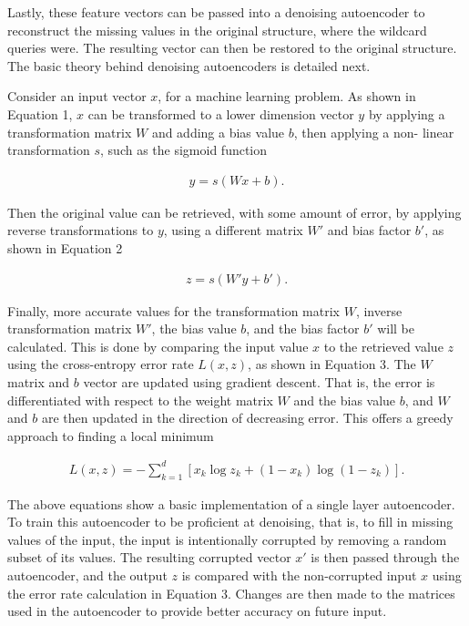 \documentclass{sig-alternate}
\begin{document}
Lastly, these feature vectors can be passed into a denoising autoencoder to reconstruct the missing values
in the original structure, where the wildcard queries were. The resulting vector can then be restored
to the original structure. The basic theory behind denoising autoencoders is detailed next.

Consider an input vector $x$, for a machine learning problem.
As shown in Equation 1, $x$ can be transformed to a lower dimension
vector $y$ by applying a transformation matrix $W$ and adding a bias value $b$, then applying a non-
linear transformation $s$, such as the sigmoid function

\begin{gather}
y = s(Wx + b).
\end{gather}

Then the original value can be retrieved, with some amount of error, by applying reverse transformations to $y$,
using a different matrix $W'$ and bias factor $b'$, as shown in Equation 2

\begin{gather}
z = s(W' y  + b').
\end{gather}

Finally, more accurate values for the transformation matrix $W$, inverse transformation matrix $W'$, the bias value $b$, and the bias factor $b'$ will be calculated. This is done by comparing the input value $x$ to the retrieved value $z$ 
using the cross-entropy error rate $L(x,z)$, as shown in Equation 3. The $W$ matrix and $b$ vector
are updated using gradient descent. That is, the error is differentiated
with respect to the weight matrix $W$ and the bias value $b$, and $W$ and $b$ are then updated in the
direction of decreasing error. This offers a greedy approach to finding a local minimum

\begin{gather}
L(x,z) = -\sum_{k=1}^d [x_k \log z_k + (1-x_k) \log(1-z_k)].
\end{gather}

The above equations show a basic implementation of a single layer autoencoder. To train this
autoencoder to be proficient at denoising, that is, to fill in missing values of the input, the input
is intentionally corrupted by removing a random subset of its values. The resulting corrupted
vector $x'$ is then passed through the autoencoder, and the output $z$ is compared with the
non-corrupted input $x$ using the error rate calculation in Equation 3. Changes are then made
to the matrices used in the autoencoder to provide better accuracy on future input.
\end{document}
